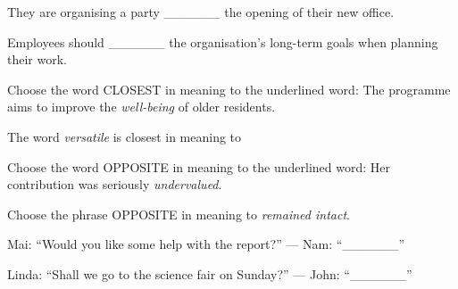 \begin{ex}
They are organising a party ______ the opening of their new office.
\end{ex}

\begin{ex}
Employees should ______ the organisation's long-term goals when planning their work.
\end{ex}

\begin{ex}
Choose the word CLOSEST in meaning to the underlined word: The programme aims to improve the \textit{well-being} of older residents.
\end{ex}

\begin{ex}
The word \textit{versatile} is closest in meaning to
\end{ex}

\begin{ex}
Choose the word OPPOSITE in meaning to the underlined word: Her contribution was seriously \textit{undervalued}.
\end{ex}

\begin{ex}
Choose the phrase OPPOSITE in meaning to \textit{remained intact}.
\end{ex}

\begin{ex}
Mai: “Would you like some help with the report?” — Nam: “______”
\end{ex}

\begin{ex}
Linda: “Shall we go to the science fair on Sunday?” — John: “______”
\end{ex}

